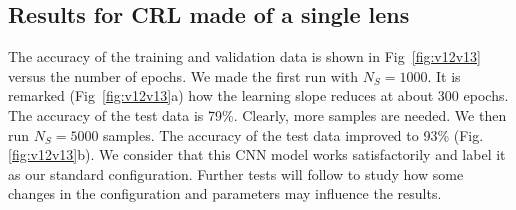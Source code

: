 \documentclass[preprint]{iucr}
\begin{document}
 \subsection{Results for CRL made of a single lens}
 The accuracy of the training and validation data is shown in Fig~\ref{fig:v12v13} versus the number of epochs.
 We made the first run with $N_S=1000$.
 It is remarked (Fig~\ref{fig:v12v13}a) how the learning slope reduces at about 300 epochs. The accuracy of the test data is 79\%.
 Clearly, more samples are needed. We then run $N_S=5000$ samples. The accuracy of the test data improved to 93\% (Fig.\ref{fig:v12v13}b).
 We consider that this CNN model works satisfactorily and label it as our standard configuration. Further tests will follow to study how some changes in the configuration and parameters may influence the results.
\end{document}
